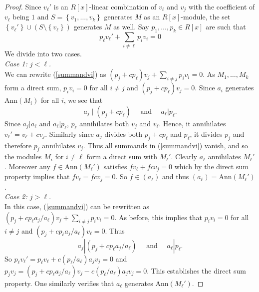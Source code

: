 \documentclass[11pt]{article}
\theoremstyle{definition}
\numberwithin{equation}{section}
\newcommand{\Ann}{\mathrm{Ann}}
\begin{document}
\begin{proof}  Since $ v_{\ell}' $ is an $R[x]$-linear combination of $ v_{\ell} $ and $ v_{j} $ with the coefficient of $ v_{\ell} $ being $ 1 $ and $ S =  \left \{  v_{1},  \ldots,  v_{k}   \right \} $ generates $ M $ as an $R[x]$-module, the set $  \left \{ v_{\ell} ' \right \} \cup ( S \setminus \left \{ v_{\ell} \right \} ) $  generates $ M $  as  well.     Say $ p_{1} ,  \ldots,  p_{k} \in  R[x]  $ are such that
\begin{equation}  \label{summandvi} \displaystyle p_{\ell} v_{\ell} ' +  \sum_{ i \neq \ell} p_{i} v_{i}  =  0  
\end{equation}      We divide into two cases. \\

\textit{Case 1: $j < \ell $.} \\

We can rewrite (\ref{summandvi}) as $   (p_{j} + c p_{\ell}  )   v_{j  }    +   \sum _{ i \neq j }  p_{i}   v_{i}   =  0   $. As $ M_{1} , \ldots, M_{k} $ form a direct sum,  $ p_{i} v_{i} = 0 $ for all $ i \neq j $ and   $ (p_{j} + cp_{\ell}) v_{j}  = 0  $.  Since $ a_{i} $ generates  $  \Ann  (M _{i })    $ for all $ i $, we see that   $$  a_{j}  \mid ( p_{j}  + c p_{
\ell}) \quad  \text{ and }  \quad    a_{\ell}  |  p_{\ell}  . $$ 
Since $ a_{j} | a_{\ell} $ and $ a_{\ell} | p_{\ell} $, $ p_{\ell} $ annihilates both $ v_{j} $ and $ v_{\ell} $. Hence, it annihilates $ v_{\ell} ' = v_{\ell} + c v_{j} $. Similarly since $ a_{j} $ divides  both $ p_{j} + c p_{\ell} $ and $ p_{\ell} $, it divides $ p_{j} $ and therefore $ p_{j} $ annihilates $ v_{j} $.  Thus all summands in (\ref{summandvi})  vanish, and so the modules $ M_{i} $ for $ i \neq \ell $ 
form a direct sum with $ M_{\ell} '  $. Clearly $ a_{\ell } $ annihilates $ M_{\ell} ' $. Moreover any  
$ f \in \mathrm{Ann}(M_{\ell}  '    )  $ satisfies $  f v_{\ell} +  f c v_{j} = 0 $ which by the direct sum property  implies that   $ f v_{\ell} = fcv_{j} = 0 $. So $ f \in ( a_{\ell} ) $ and thus  $ (a_{\ell} ) =  \mathrm{Ann}(M_{\ell}') $. \\

\textit{Case 2:   $ j > \ell $.} \\

 In this case, (\ref{summandvi}) can be rewritten as $ (p_{j} + c p_{\ell}  a_{j} /  a_{\ell}  ) v_{j} + \sum_{i \neq j} p_{i} v_{i} = 0 $.  As before, this implies that $ p_{i} v_{i} = 0 $ for all $i \neq j $ and $ (p_{j} + c  p_{\ell} a_{j} / a_{\ell}  )  v_{\ell} = 0 $.  Thus $$  a_{j} |  (  p_{j} + c p_{\ell} a_{j} / a_{\ell} ) \quad \text{ and } \quad a_{\ell} | p_{\ell} . $$ 
So $     p_{\ell} v_{\ell} '  = p_{\ell}    v_{\ell} +  c  \left (  p_ { \ell}  /   {  a_{\ell}  }  \right )    a_{j} v_{j}         =  0 $ and $    p_{j} v_{j}  =     (  p_{j} + c p_{\ell}  a_{j}/ a_{\ell}  )   v_{j}  -    c ( p_{\ell} / a_{\ell} )  a_{j} v_{j} = 0  $. This  establishes the direct sum property.  One similarly verifies  that $ a_{\ell} $ generates $ \mathrm{Ann}(M_{\ell} ' ) $.          
\end{proof} 
\end{document}
